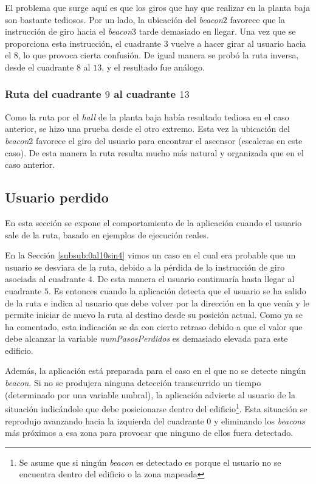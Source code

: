 El problema que surge aquí es que los giros que hay que realizar en la planta baja son bastante tediosos. Por un lado, la ubicación del \textit{beacon$2$} favorece que la instrucción de giro hacia el \textit{beacon$3$} tarde demasiado en llegar. Una vez que se proporciona esta instrucción, el cuadrante $3$ vuelve a hacer girar al usuario hacia el $8$, lo que provoca cierta confusión. De igual manera se probó la ruta inversa, desde el cuadrante $8$ al $13$, y el resultado fue análogo.


\subsubsection{Ruta del cuadrante $9$ al cuadrante $13$}
\label{subsub:9al13}

Como la ruta por el \textit{hall} de la planta baja había resultado tediosa en el caso anterior, se hizo una prueba desde el otro extremo. Esta vez la ubicación del \textit{beacon$2$} favorece el giro del usuario para encontrar el ascensor (escaleras en este caso). De esta manera la ruta resulta mucho más natural y organizada que en el caso anterior.

\subsection{Usuario perdido}
\label{sub:usuarioPerdido}

En esta sección se expone el comportamiento de la aplicación cuando el usuario sale de la ruta, basado en ejemplos de ejecución reales. 

En la Sección \ref{subsub:0al10sin4} vimos un caso en el cual era probable que un usuario se desviara de la ruta, debido a la pérdida de la instrucción de giro asociada al cuadrante $4$. De esta manera el usuario continuaría hasta llegar al cuadrante $5$. Es entonces cuando la aplicación detecta que el usuario se ha salido de la ruta e indica al usuario que debe volver por la dirección en la que venía y le permite iniciar de nuevo la ruta al destino desde su posición actual. Como ya se ha comentado, esta indicación se da con cierto retraso debido a que el valor que debe alcanzar la variable \textit{numPasosPerdidos} es demasiado elevada para este edificio. 

Además, la aplicación está preparada para el caso en el que no se detecte ningún \textit{beacon}. Si no se produjera ninguna detección transcurrido un tiempo (determinado por una variable umbral), la aplicación advierte al usuario de la situación indicándole que debe posicionarse dentro del edificio\footnote{Se asume que si ningún \textit{beacon} es detectado es porque el usuario no se encuentra dentro del edificio o la zona mapeada}. Esta situación se reprodujo avanzando hacia la izquierda del cuadrante $0$ y eliminando los \textit{beacons} más próximos a esa zona para provocar que ninguno de ellos fuera detectado.


